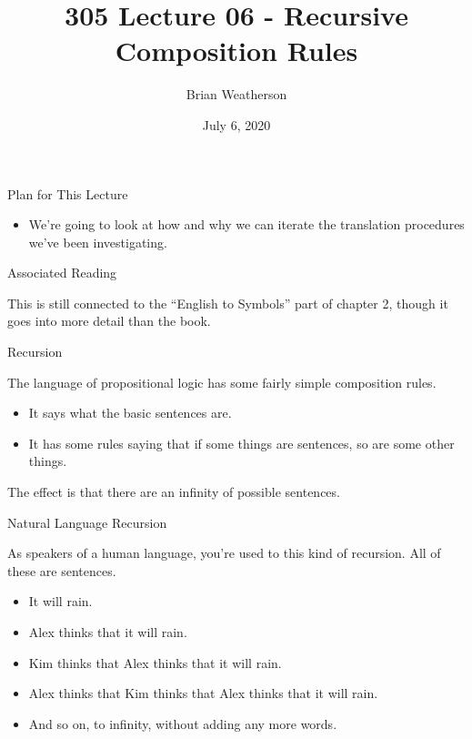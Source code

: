 \documentclass[
  ignorenonframetext,
]{beamer}
\title{305 Lecture 06 - Recursive Composition Rules}
\author{Brian Weatherson}
\date{July 6, 2020}
\providecommand{\tightlist}{%
  \setlength{\itemsep}{0pt}\setlength{\parskip}{0pt}}
\renewcommand{\,}{\text{, }}
\begin{document}
\frame{\titlepage}

\begin{frame}{Plan for This Lecture}
\protect\hypertarget{plan-for-this-lecture}{}

\begin{itemize}
\tightlist
\item
  We're going to look at how and why we can iterate the translation
  procedures we've been investigating.
\end{itemize}

\end{frame}

\begin{frame}{Associated Reading}
\protect\hypertarget{associated-reading}{}

This is still connected to the ``English to Symbols'' part of chapter 2,
though it goes into more detail than the book.

\end{frame}

\begin{frame}{Recursion}
\protect\hypertarget{recursion}{}

The language of propositional logic has some fairly simple composition
rules.

\begin{itemize}
\tightlist
\item
  It says what the basic sentences are.
\item
  It has some rules saying that if some things are sentences, so are
  some other things.
\end{itemize}

The effect is that there are an infinity of possible sentences.

\end{frame}

\begin{frame}{Natural Language Recursion}
\protect\hypertarget{natural-language-recursion}{}

As speakers of a human language, you're used to this kind of recursion.
All of these are sentences.

\begin{itemize}[<+->]
\tightlist
\item
  It will rain.
\item
  Alex thinks that it will rain.
\item
  Kim thinks that Alex thinks that it will rain.
\item
  Alex thinks that Kim thinks that Alex thinks that it will rain.
\item
  And so on, to infinity, without adding any more words.
\end{itemize}

\end{frame}
\end{document}

